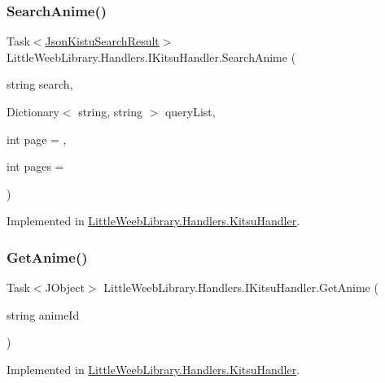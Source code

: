 \subsubsection{\texorpdfstring{Search\+Anime()}{SearchAnime()}}
{\footnotesize\ttfamily Task$<$\mbox{\hyperlink{class_little_weeb_library_1_1_models_1_1_json_kistu_search_result}{Json\+Kistu\+Search\+Result}}$>$ Little\+Weeb\+Library.\+Handlers.\+I\+Kitsu\+Handler.\+Search\+Anime (\begin{DoxyParamCaption}\item[{string}]{search,  }\item[{Dictionary$<$ string, string $>$}]{query\+List,  }\item[{int}]{page = {},  }\item[{int}]{pages = {} }\end{DoxyParamCaption})}



Implemented in \mbox{\hyperlink{class_little_weeb_library_1_1_handlers_1_1_kitsu_handler_a92f121e8fec8cce5ffe0454d3a17c156}{Little\+Weeb\+Library.\+Handlers.\+Kitsu\+Handler}}.

\mbox{\label{interface_little_weeb_library_1_1_handlers_1_1_i_kitsu_handler_a85c4f22da758a475c55327fa6393935c}} 
\subsubsection{\texorpdfstring{Get\+Anime()}{GetAnime()}}
{\footnotesize\ttfamily Task$<$J\+Object$>$ Little\+Weeb\+Library.\+Handlers.\+I\+Kitsu\+Handler.\+Get\+Anime (\begin{DoxyParamCaption}\item[{string}]{anime\+Id }\end{DoxyParamCaption})}



Implemented in \mbox{\hyperlink{class_little_weeb_library_1_1_handlers_1_1_kitsu_handler_a4c88ed25befe2904416b4d90673a8f82}{Little\+Weeb\+Library.\+Handlers.\+Kitsu\+Handler}}.

\mbox{\label{interface_little_weeb_library_1_1_handlers_1_1_i_kitsu_handler_adc4f3c45aec996b1f94894368f818de4}} 
